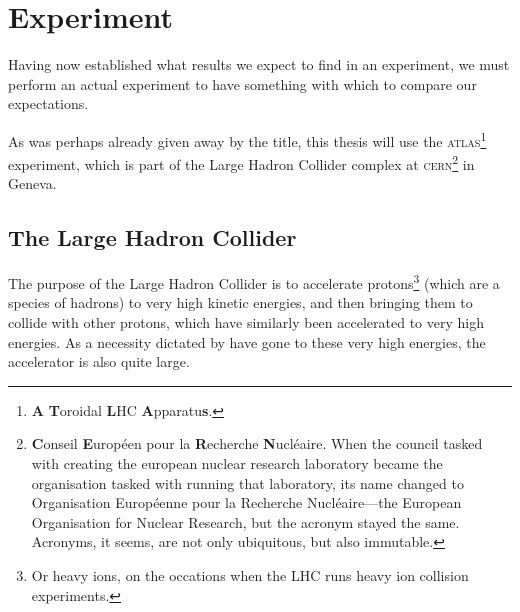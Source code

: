 \chapter{Experiment}\label{ch.exp}

Having now established what results we expect to find in an experiment, we must perform an actual experiment to have something with which to compare our expectations. 

As was perhaps already given away by the title, this thesis will use the \textsc{atlas}\footnote{\textbf{A} \textbf{T}oroidal \textbf{L}HC \textbf{A}pparatu\textbf{s}.} experiment, which is part of the Large Hadron Collider complex at \textsc{cern}\footnote{\textbf{C}onseil \textbf{E}uropéen pour la \textbf{R}echerche \textbf{N}ucléaire. When the council tasked with creating the european nuclear research laboratory became the organisation tasked with running that laboratory, its name changed to Organisation Européenne pour la Recherche Nucléaire---the European Organisation for Nuclear Research, but the acronym stayed the same. Acronyms, it seems, are not only ubiquitous, but also immutable.} in Geneva.

\section{The Large Hadron Collider}

The purpose of the Large Hadron Collider is to accelerate protons\footnote{Or heavy ions, on the occations when the LHC runs heavy ion collision experiments.} (which are a species of hadrons) to very high kinetic energies, and then bringing them to collide with other protons, which have similarly been accelerated to very high energies. As a necessity dictated by have gone to these very high energies, the accelerator is also quite large.

